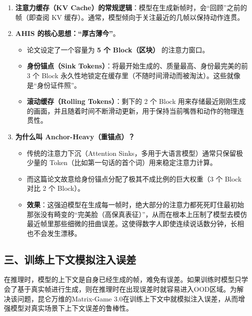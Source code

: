 \begin{enumerate}
\def\labelenumi{\arabic{enumi}.}
\item
  \textbf{注意力缓存（KV Cache）的常规逻辑}：模型在生成新帧时，会``回顾''之前的帧（即查阅 KV 缓存）。通常，模型倾向于关注最近的几帧以保持动作连贯。
\item
  \textbf{AHIS 的核心思想：``厚古薄今''}。

  \begin{itemize}
  \tightlist
  \item
    论文设定了一个容量为 \textbf{5 个 Block（区块）} 的注意力窗口。
  \item
    \textbf{身份锚点（Sink Tokens）}：将最开始生成的、质量最高、身份最完美的前 3 个 Block 永久性地锁定在缓存里（不随时间滑动而被淘汰）。这些就像是``身份证件照''。
  \item
    \textbf{滚动缓存（Rolling Tokens）}：剩下的 2 个 Block 用来存储最近刚刚生成的画面，并且随着时间不断滑动更新，用于保持当前嘴唇和动作的物理连贯性。
  \end{itemize}
\item
  \textbf{为什么叫 Anchor-Heavy（重锚点）？}

  \begin{itemize}
  \tightlist
  \item
    传统的注意力下沉（Attention Sinks，多用于大语言模型）通常只保留极少量的 Token（比如第一句话的首个词）用来稳定注意力计算。
  \item
    而这篇论文故意给身份锚点分配了极其不成比例的巨大权重（3 个 Block 对比 2 个 Block）。
  \item
    \textbf{效果}：这强迫模型在生成每一帧时，绝大部分的注意力都死死盯住最初始那张没有畸变的``完美脸（高保真表征）''，从而在根本上压制了模型去模仿最近帧里那些细微的扭曲误差。这使得数字人即使连续说话数分钟，长相也不会发生漂移。
  \end{itemize}
\end{enumerate}

\hypertarget{ux4e09ux8badux7ec3ux4e0aux4e0bux6587ux6a21ux62dfux6ce8ux5165ux8befux5dee}{%
\subsection{三、训练上下文模拟注入误差}\label{ux4e09ux8badux7ec3ux4e0aux4e0bux6587ux6a21ux62dfux6ce8ux5165ux8befux5dee}}

在推理时，模型的上下文是自身已经生成的帧，难免有误差。如果训练时模型只学会了基于真实帧进行生成，则在推理时在出现误差时就容易进入OOD区域。为解决该问题，昆仑万维的Matrix-Game 3.0在训练上下文中就模拟注入误差，从而增强模型对真实场景下上下文误差的鲁棒性。

